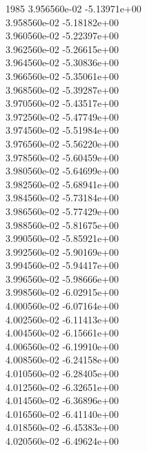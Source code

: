 1985	3.956560e-02	-5.13971e+00	\\ 	3.958560e-02	-5.18182e+00	\\ 	3.960560e-02	-5.22397e+00	\\ 	3.962560e-02	-5.26615e+00	\\ 	3.964560e-02	-5.30836e+00	\\ 	3.966560e-02	-5.35061e+00	\\ 	3.968560e-02	-5.39287e+00	\\ 	3.970560e-02	-5.43517e+00	\\ 	3.972560e-02	-5.47749e+00	\\ 	3.974560e-02	-5.51984e+00	\\ 	3.976560e-02	-5.56220e+00	\\ 	3.978560e-02	-5.60459e+00	\\ 	3.980560e-02	-5.64699e+00	\\ 	3.982560e-02	-5.68941e+00	\\ 	3.984560e-02	-5.73184e+00	\\ 	3.986560e-02	-5.77429e+00	\\ 	3.988560e-02	-5.81675e+00	\\ 	3.990560e-02	-5.85921e+00	\\ 	3.992560e-02	-5.90169e+00	\\ 	3.994560e-02	-5.94417e+00	\\ 	3.996560e-02	-5.98666e+00	\\ 	3.998560e-02	-6.02915e+00	\\ 	4.000560e-02	-6.07164e+00	\\ 	4.002560e-02	-6.11413e+00	\\ 	4.004560e-02	-6.15661e+00	\\ 	4.006560e-02	-6.19910e+00	\\ 	4.008560e-02	-6.24158e+00	\\ 	4.010560e-02	-6.28405e+00	\\ 	4.012560e-02	-6.32651e+00	\\ 	4.014560e-02	-6.36896e+00	\\ 	4.016560e-02	-6.41140e+00	\\ 	4.018560e-02	-6.45383e+00	\\ 	4.020560e-02	-6.49624e+00	\\ \hline
